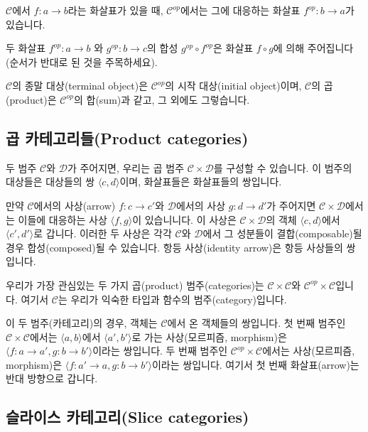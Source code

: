 \documentclass[DaoFP]{subfiles}
\begin{document}
$\mathcal{C}$에서 $f \colon a \to b$라는 화살표가 있을 때, $\mathcal{C}^{op}$에서는 그에 대응하는 화살표 $f^{op} \colon b \to a$가 있습니다.

두 화살표 $f^{op} \colon a \to b$ 와 $g^{op} \colon b \to c$의 합성 $g^{op} \circ f^{op}$은 화살표 $f \circ g$에 의해 주어집니다 (순서가 반대로 된 것을 주목하세요).

$\mathcal{C}$의 종말 대상(terminal object)은 $\mathcal{C}^{op}$의 시작 대상(initial object)이며, $\mathcal{C}$의 곱(product)은 $\mathcal{C}^{op}$의 합(sum)과 같고, 그 외에도 그렇습니다.

\subsection{곱 카테고리들(Product categories)}

두 범주 $\mathcal{C}$와 $\mathcal{D}$가 주어지면, 우리는 곱 범주 $\mathcal{C} \times \mathcal{D}$를 구성할 수 있습니다. 이 범주의 대상들은 대상들의 쌍 $\langle c, d \rangle $이며, 화살표들은 화살표들의 쌍입니다.

만약 $\mathcal{C}$에서의 사상(arrow) $f \colon c \to c'$와 $\mathcal{D}$에서의 사상 $g \colon d \to d'$가 주어지면 $\mathcal{C} \times \mathcal{D}$에서는 이들에 대응하는 사상 $\langle f, g \rangle$이 있습니니다. 이 사상은 $\mathcal{C} \times \mathcal{D}$의 객체 $\langle c, d \rangle $에서 $\langle c', d' \rangle $로 갑니다. 이러한 두 사상은 각각 $\mathcal{C}$와 $\mathcal{D}$에서 그 성분들이 결합(composable)될 경우 합성(composed)될 수 있습니다. 항등 사상(identity arrow)은 항등 사상들의 쌍입니다.

우리가 가장 관심있는 두 가지 곱(product) 범주(categories)는 $\mathcal{C} \times \mathcal{C}$와 $\mathcal{C}^{op} \times \mathcal{C}$입니다. 여기서 $\mathcal{C}$는 우리가 익숙한 타입과 함수의 범주(category)입니다.

이 두 범주(카테고리)의 경우, 객체는 $\mathcal{C}$에서 온 객체들의 쌍입니다. 첫 번째 범주인 $\mathcal{C} \times \mathcal{C}$에서는 $\langle a, b \rangle $에서 $\langle a', b' \rangle $로 가는 사상(모르피즘, morphism)은 $\langle f \colon a \to a', g \colon b \to b' \rangle $이라는 쌍입니다. 두 번째 범주인 $\mathcal{C}^{op} \times \mathcal{C}$에서는 사상(모르피즘, morphism)은 $\langle f \colon a' \to a, g \colon b \to b' \rangle $이라는 쌍입니다. 여기서 첫 번째 화살표(arrow)는 반대 방향으로 갑니다.

\subsection{슬라이스 카테고리(Slice categories)}
\end{document}

